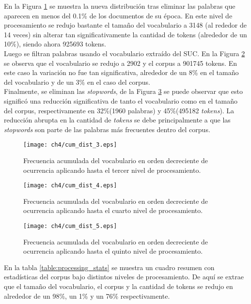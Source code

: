 En la Figura \ref{img:cum_dist3} se muestra la nueva distribución tras eliminar las palabras que aparecen en menos del 0.1\% de los documentos de su época. En este nivel de procesamiento se redujo bastante el tamaño del vocabulario a 3148 (al rededor de 14 veces) sin alterar tan significativamente la cantidad de tokens (alrededor de un 10\%), siendo ahora 925693 tokens.\\

Luego se filtran palabras usando el vocabulario extraído del SUC. En la Figura \ref{img:cum_dist4} se observa que el vocabulario se redujo a 2902 y el corpus a 901745 tokens. En este caso la variación no fue tan significativa, alrededor de un 8\% en el tamaño del vocabulario y de un 3\% en el caso del corpus.\\

Finalmente, se eliminan las \textit{stopwords}, de la Figura \ref{img:cum_dist5} se puede observar que esto significó una reducción significativa de tanto el vocabulario como en el tamaño del corpus, respectivamente en 32\%(1960 palabras) y 45\%(495182 \textit{tokens}). La reducción abrupta en la cantidad de \textit{tokens} se debe principalmente a que las \textit{stopwords} son parte de las palabras más frecuentes dentro del corpus.

\begin{figure}
    \centering
    \texttt{[image: ch4/cum\_dist\_3.eps]}
    \caption{Frecuencia acumulada del vocabulario en orden decreciente de ocurrencia aplicando hasta el tercer nivel de procesamiento.}
    \label{img:cum_dist3}
\end{figure}

\begin{figure}
    \centering
    \texttt{[image: ch4/cum\_dist\_4.eps]}
    \caption{Frecuencia acumulada del vocabulario en orden decreciente de ocurrencia aplicando hasta el cuarto nivel de procesamiento.}
    \label{img:cum_dist4}
\end{figure}

\begin{figure}
    \centering
    \texttt{[image: ch4/cum\_dist\_5.eps]}
    \caption{Frecuencia acumulada del vocabulario en orden decreciente de ocurrencia aplicando hasta el quinto nivel de procesamiento.}
    \label{img:cum_dist5}
\end{figure}

En la tabla \ref{table:processing_stats} se muestra un cuadro resumen con estadísticas del corpus bajo distintos niveles de procesamiento. De aquí se extrae que el tamaño del vocabulario, el corpus y la cantidad de tokens se redujo en alrededor de un 98\%, un 1\% y un 76\% respectivamente.

